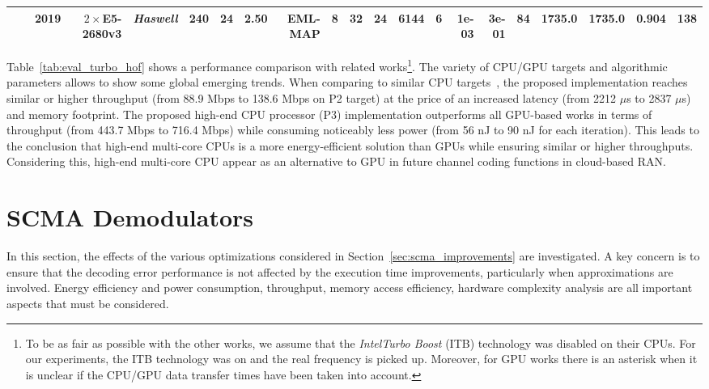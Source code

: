 \begin{table}
\begin{adjustbox}{angle=90}
{{\begin{tabular}{|r|r|r||r|r|r|r|r|r|r|r|r|r|r||r|r|r|r||r|r|r|}
                                                                 & \cite{LeGal2019a}                     & 2019                  & $2\times$E5-2680v3       & \textit{Haswell}                 & 240                  & 24                 & 2.50                   & EML-MAP                  & 8                   & 32                  & 24                  & 6144                  & 6                  & 1e-03                         & 3e-01                    &     84        & 1735.0           & 1735.0         & 0.904         &    138             \\
  \hline
  \end{tabular}
  }}
  \end{adjustbox}
\end{table}

Table~\ref{tab:eval_turbo_hof} shows a performance comparison with related
works\footnote{To be as fair as possible with the other works, we assume that
the \emph{Intel\R Turbo Boost} (ITB) technology was disabled on their CPUs. For
our experiments, the ITB technology was on and the real frequency is picked up.
Moreover, for GPU works there is an asterisk when it is unclear if the CPU/GPU
data transfer times have been taken into account.}. The variety of CPU/GPU
targets and algorithmic parameters allows to show some global emerging trends.
When comparing to similar CPU targets~\cite{Zhang2012,Wu2013}, the proposed
implementation reaches similar or higher throughput (from 88.9 Mbps to 138.6
Mbps on P2 target) at the price of an increased latency (from 2212 $\mu$s to
2837 $\mu$s) and memory footprint. The proposed high-end CPU processor (P3)
implementation outperforms all GPU-based works in terms of throughput (from
443.7 Mbps to 716.4 Mbps) while consuming noticeably less power (from 56 nJ to
90 nJ for each iteration). This leads to the conclusion that high-end multi-core
CPUs is a more energy-efficient solution than GPUs while ensuring similar or
higher throughputs. Considering this, high-end multi-core CPU appear as an
alternative to GPU in future channel coding functions in cloud-based RAN.

\section{SCMA Demodulators}
\label{sec:eval_scma}

In this section, the effects of the various optimizations considered in
Section~\ref{sec:scma_improvements} are investigated. A key concern is to ensure
that the decoding error performance is not affected by the execution time
improvements, particularly when approximations are involved. Energy efficiency
and power consumption, throughput, memory access efficiency, hardware complexity
analysis are all important aspects that must be considered.

